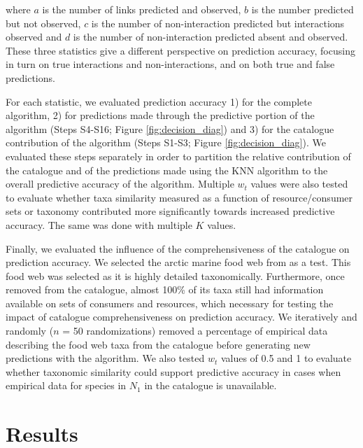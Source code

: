 \documentclass[letterpaper]{article}
\begin{document}
where $a$ is the number of links predicted and observed, $b$ is the number predicted but not observed, $c$ is the number of non-interaction predicted but interactions observed and $d$ is the number of non-interaction predicted absent and observed. These three statistics give a different perspective on prediction accuracy, focusing in turn on true interactions and non-interactions, and on both true and false predictions.

For each statistic, we evaluated prediction accuracy 1) for the complete algorithm, 2) for predictions made through the predictive portion of the algorithm (Steps S4-S16; Figure \ref{fig:decision_diag}) and 3) for the catalogue contribution of the algorithm (Steps S1-S3; Figure \ref{fig:decision_diag}). We evaluated these steps separately in order to partition the relative contribution of the catalogue and of the predictions made using the KNN algorithm to the overall predictive accuracy of the algorithm. Multiple $w_t$ values were also tested to evaluate whether taxa similarity measured as a function of resource/consumer sets or taxonomy contributed more significantly towards increased predictive accuracy. The same was done with multiple $K$ values.

Finally, we evaluated the influence of the comprehensiveness of the catalogue on prediction accuracy. We selected the arctic marine food web from \citet{Kortsch2015} as a test. This food web was selected as it is highly detailed taxonomically. Furthermore, once removed from the catalogue, almost 100\% of its taxa still had information available on sets of consumers and resources, which necessary for testing the impact of catalogue comprehensiveness on prediction accuracy. We iteratively and randomly ($n$ = 50 randomizations) removed a percentage of empirical data describing the food web taxa from the catalogue before generating new predictions with the algorithm. We also tested $w_t$ values of 0.5 and 1 to evaluate whether taxonomic similarity could support predictive accuracy in cases when empirical data for species in $N_1$ in the catalogue is unavailable.

\section{Results}
\end{document}
